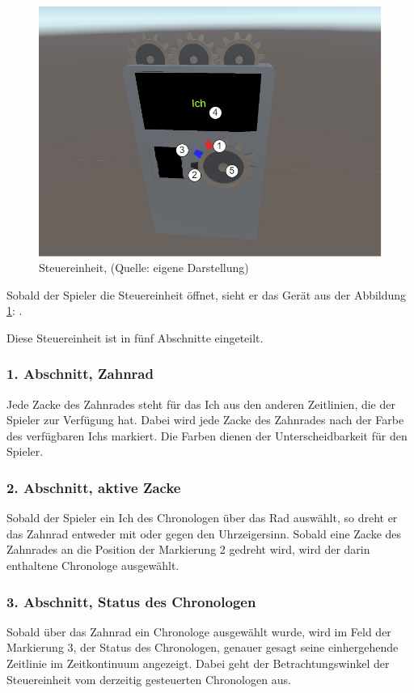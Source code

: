 \begin{figure}[ht]
\centering
\includegraphics[width=0.6\linewidth]{content/pictures/SplitDevice_markers.jpg}
\caption{Steuereinheit, (Quelle: eigene Darstellung)}
\label{fig:split_device_marker}
\end{figure}

Sobald der Spieler die Steuereinheit öffnet, sieht er das Gerät aus der Abbildung \ref{fig:split_device_marker}: .

Diese Steuereinheit ist in fünf Abschnitte eingeteilt.

\subsubsection{1. Abschnitt, Zahnrad}
Jede Zacke des Zahnrades steht für das Ich aus den anderen Zeitlinien, die der Spieler zur Verfügung hat. Dabei wird jede Zacke des Zahnrades nach der Farbe des verfügbaren Ichs markiert. Die Farben dienen der Unterscheidbarkeit für den Spieler.
\subsubsection{2. Abschnitt, aktive Zacke}
Sobald der Spieler ein Ich des Chronologen über das Rad auswählt, so dreht er das Zahnrad entweder mit oder gegen den Uhrzeigersinn. Sobald eine Zacke des Zahnrades an die Position der Markierung 2 gedreht wird, wird der darin enthaltene Chronologe ausgewählt. 
\subsubsection{3. Abschnitt, Status des Chronologen}
Sobald über das Zahnrad ein Chronologe ausgewählt wurde, wird im Feld der Markierung 3, der Status des Chronologen, genauer gesagt seine einhergehende Zeitlinie im Zeitkontinuum angezeigt. Dabei geht der Betrachtungswinkel der Steuereinheit vom derzeitig gesteuerten Chronologen aus.
